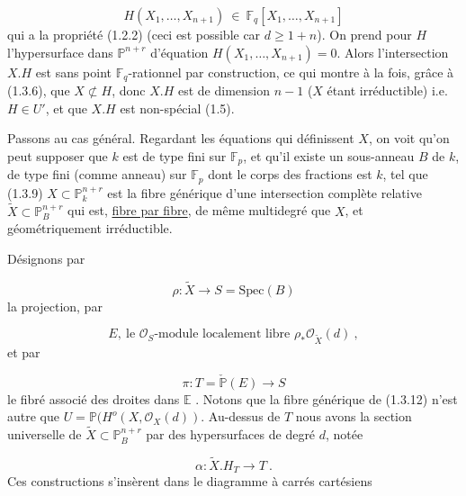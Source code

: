 \begin{equation}\tag{1.3.8}
H(X_1,\dots,X_{n+1}) \ \in \ \mathbb{F}_q[X_1,\dots, X_{n+1}]
\end{equation}
qui a la propriété (1.2.2) (ceci est possible car $d \geq 1+n$). On prend pour $H$ l'hypersurface dans $\mathbb{P}^{n+r}$ d'équation $H(X_1,\dots,X_{n+1}) = 0$. Alors
l'intersection $X.H$ est sans point $\mathbb{F}_q$-rationnel par construction, ce qui montre à la fois, grâce à (1.3.6), que $X \not\subset H$, donc $X.H$ est de dimension $n-1$ ($X$ étant irréductible) i.e. $H \in U'$, et que $X.H$ est non-spécial (1.5).

Passons au cas général. Regardant les équations qui définissent $X$, on voit qu'on peut supposer que $k$ est de type fini sur $\mathbb{F}_p$, et qu'il existe un sous-anneau $B$ de $k$, de type fini (comme anneau) sur $\mathbb{F}_p$ dont le corps des fractions est $k$, tel que (1.3.9) $X \subset \mathbb{P}^{n+r}_k$ est la fibre générique d'une intersection complète relative $\widetilde{X} \subset \mathbb{P}^{n+r}_B$ qui est, \underline{fibre par fibre}, de même multidegré que $X$, et géométriquement irréductible.

Désignons par

\begin{equation}\tag{1.3.10}
\rho : \widetilde{X} \longrightarrow S = \mathrm{Spec}(B)
\end{equation}
la projection, par

\begin{equation}\tag{1.3.11}
E, \ \mbox{le } \mathcal{O}_S\mbox{-module localement libre } \rho_*\mathcal{O}_{\widetilde{X}}(d) \ ,
\end{equation}
et par

\begin{equation}\tag{1.3.12}
\pi : T = \check{\mathbb{P}}(E) \longrightarrow S
\end{equation}
le fibré associé des droites dans $\mathbb{E}$ . Notons que la fibre générique de (1.3.12) n'est autre que $U = \mathbb{P}(H^o(X,\mathcal{O}_X(d))$. Au-dessus de $T$ nous avons la section universelle de $\widetilde{X} \subset \mathbb{P}^{n+r}_B$ par des hypersurfaces de degré $d$, notée 



\begin{equation}\tag{1.3.13}
 \alpha : \widetilde{X}.H_T \longrightarrow T \ .
\end{equation}
Ces constructions s'insèrent dans le diagramme à carrés cartésiens

